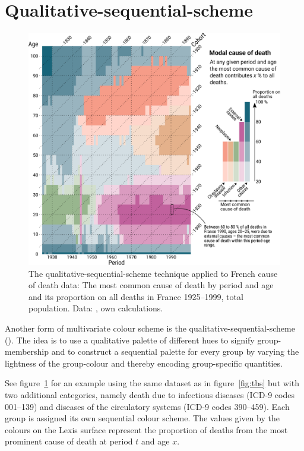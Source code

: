 \documentclass[parskip=half]{scrartcl}
\begin{document}
\section{Qualitative-sequential-scheme} %
\label{sec:qss}

\begin{figure}[!htb]
  \centering
  \includegraphics[width = \textwidth]{./fig/qual_seq.pdf}
  \caption{The qualitative-sequential-scheme technique applied to French cause of death data: The most common cause of death by period and age and its proportion on all deaths in France 1925--1999, total population. Data: \cite{Vallin2014}, own calculations.}
  \label{fig:qss}
\end{figure}

Another form of multivariate colour scheme is the qualitative-sequential-scheme (\cite{Brewer1994}). The idea is to use a qualitative palette of different hues to signify group-membership and to construct a sequential palette for every group by varying the lightness of the group-colour and thereby encoding group-specific quantities.

See figure~\ref{fig:qss} for an example using the same dataset as in figure~\ref{fig:tbs} but with two additional categories, namely death due to infectious diseases (ICD-9 codes 001--139) and diseases of the circulatory systems (ICD-9 codes 390--459). Each group is assigned its own sequential colour scheme. The values given by the colours on the Lexis surface represent the proportion of deaths from the most prominent cause of death at period $t$ and age $x$.
\end{document}
